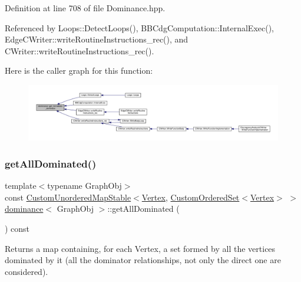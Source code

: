 Definition at line 708 of file Dominance.\+hpp.



Referenced by Loops\+::\+Detect\+Loops(), B\+B\+Cdg\+Computation\+::\+Internal\+Exec(), Edge\+C\+Writer\+::write\+Routine\+Instructions\+\_\+rec(), and C\+Writer\+::write\+Routine\+Instructions\+\_\+rec().

Here is the caller graph for this function\+:
\nopagebreak
\begin{figure}[H]
\begin{center}
\leavevmode
\includegraphics[width=350pt]{d1/d93/classdominance_abe0394af57bb3d7bf5ce14330c1c7085_icgraph}
\end{center}
\end{figure}
\mbox{\label{classdominance_a806e173d4c1bc8dea71e9b24d5868856}} 
\subsubsection{\texorpdfstring{get\+All\+Dominated()}{getAllDominated()}}
{\footnotesize\ttfamily template$<$typename Graph\+Obj$>$ \\
const \hyperlink{custom__map_8hpp_a7314a7df1cdb3a3acf478ab86e95c226}{Custom\+Unordered\+Map\+Stable}$<$\hyperlink{classdominance_acc73faf26e73171b15fd0ff6c63ca393}{Vertex}, \hyperlink{classCustomOrderedSet}{Custom\+Ordered\+Set}$<$\hyperlink{classdominance_acc73faf26e73171b15fd0ff6c63ca393}{Vertex}$>$ $>$ \hyperlink{classdominance}{dominance}$<$ Graph\+Obj $>$\+::get\+All\+Dominated (\begin{DoxyParamCaption}{ }\end{DoxyParamCaption}) const\hspace{0.3cm}{\ttfamily [inline]}}



Returns a map containing, for each Vertex, a set formed by all the vertices dominated by it (all the dominator relationships, not only the direct one are considered). 




